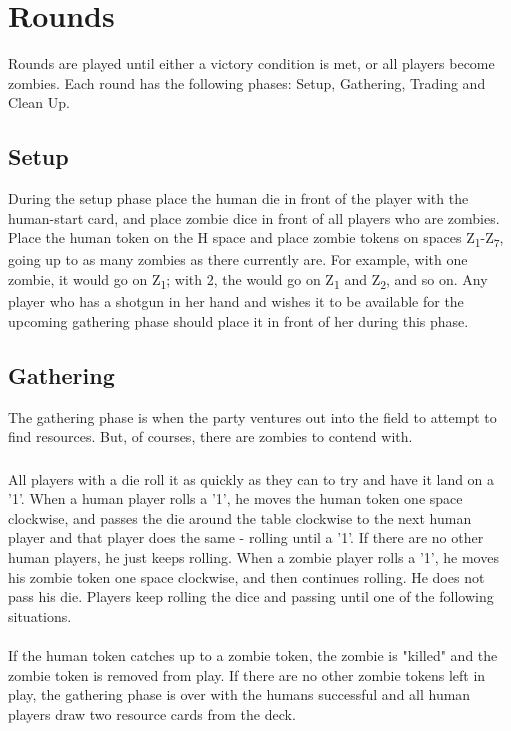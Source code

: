 \documentclass[12pt]{article} %
\begin{document}
\section{Rounds}
Rounds are played until either a victory condition is met, or all players become zombies.  Each round has the following phases: Setup, Gathering, Trading and Clean Up.

\subsection{Setup}

During the setup phase place the human die in front of the player with the human-start card, and place zombie dice in front of all players who are zombies.  Place the human token on the H space and place zombie tokens on spaces Z\textsubscript{1}-Z\textsubscript{7}, going up to as many zombies as there currently are.  For example, with one zombie, it would go on Z\textsubscript{1}; with 2, the would go on Z\textsubscript{1} and Z\textsubscript{2}, and so on.  Any player who has a shotgun in her hand and wishes it to be available for the upcoming gathering phase should place it in front of her during this phase.

\subsection{Gathering}
The gathering phase is when the party ventures out into the field to attempt to find resources.  But, of courses, there are zombies to contend with.  

\subsubsection{}
All players with a die roll it as quickly as they can to try and have it land on a '1'.  When a human player rolls a '1', he moves the human token one space clockwise, and passes the die around the table clockwise to the next human player and that player does the same - rolling until a '1'.  If there are no other human players, he just keeps rolling.  When a zombie player rolls a '1', he moves his zombie token one space clockwise, and then continues rolling.  He does not pass his die.  Players keep rolling the dice and passing until one of the following situations.

\paragraph{}
If the human token catches up to a zombie token, the zombie is "killed" and the zombie token is removed from play.  If there are no other zombie tokens left in play, the gathering phase is over with the humans successful and all human players draw two resource cards from the deck.
\end{document}
